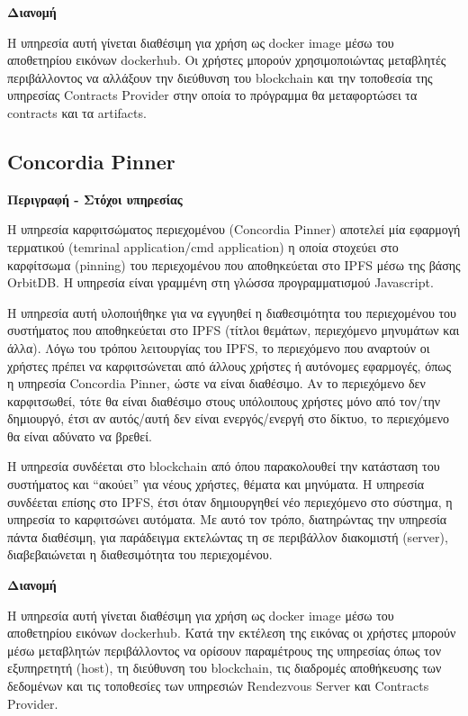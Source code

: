 \vspace{0.5cm}
\textbf{Διανομή}

Η υπηρεσία αυτή γίνεται διαθέσιμη για χρήση ως docker image μέσω του αποθετηρίου εικόνων dockerhub. Οι χρήστες μπορούν χρησιμοποιώντας μεταβλητές περιβάλλοντος να αλλάξουν την διεύθυνση του blockchain και την τοποθεσία της υπηρεσίας Contracts Provider στην οποία το πρόγραμμα θα μεταφορτώσει τα contracts και τα artifacts.

\subsection{Concordia Pinner} \label{subsection:4-4-concordia-pinner-service}

\vspace{0.5cm}
\textbf{Περιγραφή - Στόχοι υπηρεσίας}

Η υπηρεσία καρφιτσώματος περιεχομένου (Concordia Pinner) αποτελεί μία εφαρμογή τερματικού (temrinal application/cmd application) η οποία στοχεύει στο καρφίτσωμα (pinning) του περιεχομένου που αποθηκεύεται στο IPFS μέσω της βάσης OrbitDB. Η υπηρεσία είναι γραμμένη στη γλώσσα προγραμματισμού Javascript.

Η υπηρεσία αυτή υλοποιήθηκε για να εγγυηθεί η διαθεσιμότητα του περιεχομένου του συστήματος που αποθηκεύεται στο IPFS (τίτλοι θεμάτων, περιεχόμενο μηνυμάτων και άλλα). Λόγω του τρόπου λειτουργίας %
του IPFS, το περιεχόμενο που αναρτούν οι χρήστες πρέπει να καρφιτσώνεται από άλλους χρήστες ή αυτόνομες εφαρμογές, όπως η υπηρεσία Concordia Pinner, ώστε να είναι διαθέσιμο. Αν το περιεχόμενο δεν καρφιτσωθεί, τότε θα είναι διαθέσιμο στους υπόλοιπους χρήστες μόνο από τον/την δημιουργό, έτσι αν αυτός/αυτή δεν είναι ενεργός/ενεργή στο δίκτυο, το περιεχόμενο θα είναι αδύνατο να βρεθεί.

Η υπηρεσία συνδέεται στο blockchain από όπου παρακολουθεί την κατάσταση του συστήματος και ``ακούει'' για νέους χρήστες, θέματα και μηνύματα. Η υπηρεσία συνδέεται επίσης στο IPFS, έτσι όταν δημιουργηθεί νέο περιεχόμενο στο σύστημα, η υπηρεσία το καρφιτσώνει αυτόματα. Με αυτό τον τρόπο, διατηρώντας την υπηρεσία πάντα διαθέσιμη, για παράδειγμα εκτελώντας τη σε περιβάλλον διακομιστή (server), διαβεβαιώνεται η διαθεσιμότητα του περιεχομένου.

\vspace{0.5cm}
\textbf{Διανομή}

Η υπηρεσία αυτή γίνεται διαθέσιμη για χρήση ως docker image μέσω του αποθετηρίου εικόνων dockerhub. Κατά την εκτέλεση της εικόνας οι χρήστες μπορούν μέσω μεταβλητών περιβάλλοντος να ορίσουν παραμέτρους της υπηρεσίας όπως τον εξυπηρετητή (host), τη διεύθυνση του blockchain, τις διαδρομές αποθήκευσης των δεδομένων και τις τοποθεσίες των υπηρεσιών Rendezvous Server και Contracts Provider.

